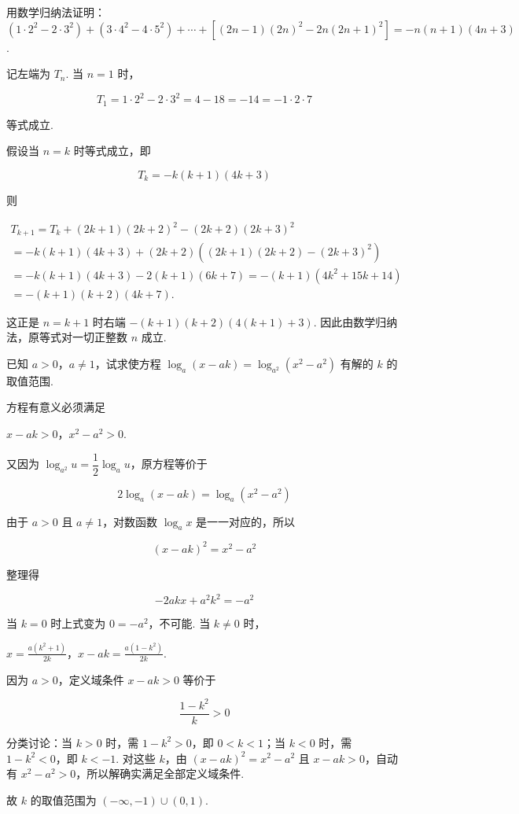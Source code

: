 \documentclass[UTF8,a4paper,oneside,11pt]{ctexbook}
\begin{document}
\begin{problem}
用数学归纳法证明：\((1 \cdot 2^2 - 2 \cdot 3^2) + (3 \cdot 4^2 - 4 \cdot 5^2) + \cdots + [(2n - 1)(2n)^2 - 2n(2n + 1)^2] = -n(n + 1)(4n + 3)\).
\end{problem}

\begin{solution}
记左端为 \(T_n\). 当 \(n=1\) 时，

\[T_1=1\cdot2^2-2\cdot3^2=4-18=-14=-1\cdot2\cdot7\]

等式成立.

假设当 \(n=k\) 时等式成立，即

\[T_k=-k(k+1)(4k+3)\]

则

\[\begin{gathered}T_{k+1}=T_k+(2k+1)(2k+2)^2-(2k+2)(2k+3)^2\\=-k(k+1)(4k+3)+(2k+2)\left((2k+1)(2k+2)-(2k+3)^2\right)\\=-k(k+1)(4k+3)-2(k+1)(6k+7)=-(k+1)(4k^2+15k+14)\\=-(k+1)(k+2)(4k+7).\end{gathered}\]

这正是 \(n=k+1\) 时右端 \(-(k+1)(k+2)\left(4(k+1)+3\right)\). 因此由数学归纳法，原等式对一切正整数 \(n\) 成立.
\end{solution}

\begin{problem}
已知 \(a > 0\)，\(a \neq 1\)，试求使方程 \(\log_a(x - ak) = \log_{a^2}(x^2 - a^2)\) 有解的 \(k\) 的取值范围.
\end{problem}

\begin{solution}
方程有意义必须满足

\(x-ak>0\)，\(x^2-a^2>0\).

又因为 \(\log_{a^2}u=\dfrac12\log_a u\)，原方程等价于

\[2\log_a(x-ak)=\log_a(x^2-a^2)\]

由于 \(a>0\) 且 \(a\neq1\)，对数函数 \(\log_a x\) 是一一对应的，所以

\[(x-ak)^2=x^2-a^2\]

整理得

\[-2akx+a^2k^2=-a^2\]

当 \(k=0\) 时上式变为 \(0=-a^2\)，不可能. 当 \(k\neq0\) 时，

\(x=\frac{a(k^2+1)}{2k}\)，\(x-ak=\frac{a(1-k^2)}{2k}\).

因为 \(a>0\)，定义域条件 \(x-ak>0\) 等价于

\[\frac{1-k^2}{k}>0\]

分类讨论：当 \(k>0\) 时，需 \(1-k^2>0\)，即 \(0<k<1\)；当 \(k<0\) 时，需 \(1-k^2<0\)，即 \(k<-1\). 对这些 \(k\)，由 \((x-ak)^2=x^2-a^2\) 且 \(x-ak>0\)，自动有 \(x^2-a^2>0\)，所以解确实满足全部定义域条件.

故 \(k\) 的取值范围为 \(\left(-\infty,-1\right)\cup\left(0,1\right)\).
\end{solution}
\end{document}
